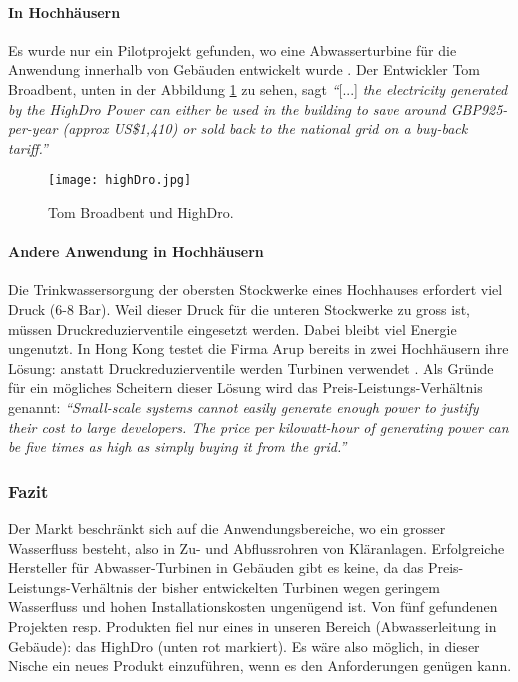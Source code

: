 \paragraph{In Hochhäusern}
Es wurde nur ein Pilotprojekt gefunden, wo eine Abwasserturbine für die Anwendung innerhalb von Gebäuden entwickelt wurde \cite{newatlas}. Der Entwickler Tom Broadbent, unten in der Abbildung \ref{fig:turbineTomBroadBent} zu sehen, sagt \textit{``}[...] \textit{the electricity generated by the HighDro Power can either be used in the building to save around GBP925-per-year (approx US\$1,410) or sold back to the national grid on a buy-back tariff.''} \cite{newatlas}
\newpage
\begin{figure}
\centering
\texttt{[image: highDro.jpg]}
\caption{Tom Broadbent und HighDro. \cite{newatlas}}
\label{fig:turbineTomBroadBent}
\end{figure}
\paragraph{Andere Anwendung in Hochhäusern}
Die Trinkwassersorgung der obersten Stockwerke eines Hochhauses erfordert viel Druck (6-8 Bar). Weil dieser Druck für die unteren Stockwerke zu gross ist, müssen Druckreduzierventile eingesetzt werden. Dabei bleibt viel Energie ungenutzt. In Hong Kong testet die Firma Arup bereits in zwei Hochhäusern ihre Lösung: anstatt Druckreduzierventile werden Turbinen verwendet \cite{nytimes}. Als Gründe für ein mögliches Scheitern dieser Lösung wird das Preis-Leistungs-Verhältnis genannt:
\textit{``Small-scale systems cannot easily generate enough power to justify their cost to large developers. The price per kilowatt-hour of generating power can be five times as high as simply buying it from the grid.''}\cite{nytimes}
\subsubsection{Fazit}
Der Markt beschränkt sich auf die Anwendungsbereiche, wo ein grosser Wasserfluss besteht, also in Zu- und Abflussrohren von Kläranlagen. Erfolgreiche Hersteller für Abwasser-Turbinen in Gebäuden gibt es keine, da das Preis-Leistungs-Verhältnis der bisher entwickelten Turbinen wegen geringem Wasserfluss und hohen Installationskosten ungenügend ist. Von fünf gefundenen Projekten resp. Produkten fiel nur eines in unseren Bereich (Abwasserleitung in Gebäude): das HighDro (unten rot markiert). Es wäre also möglich, in dieser Nische ein neues Produkt einzuführen, wenn es den Anforderungen genügen kann.

